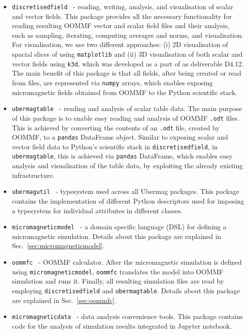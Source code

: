 \documentclass{deliverablereport}
\begin{document}
\begin{itemize}
\item \texttt{discretisedfield}~\cite{discretisedfield} - reading,
  writing, analysis, and visualisation of scalar and vector
  fields. This package provides all the necessary functionality for
  reading resulting OOMMF vector and scalar field files and their
  analysis, such as sampling, iterating, computing averages and norms,
  and visualisation. For visualisation, we use two different
  approaches: (i) 2D visualisation of spacial slices of using
  \texttt{matplotlib} and (ii) 3D visualisation of both scalar and
  vector fields using \texttt{k3d}, which was developed as a part of
  \ODK as deliverable D4.12. The main benefit of this package is
  that all fields, after being created or read from files, are
  represented via \texttt{numpy} arrays, which enables exposing
  micromagnetic fields obtained from OOMMF to the Python scientific
  stack.
\item \texttt{ubermagtable}~\cite{ubermagtable} - reading and analysis
  of scalar table data. The main purpose of this package is to enable
  easy reading and analysis of OOMMF \texttt{.odt} files. This is
  achieved by converting the contents of an \texttt{.odt} file,
  created by OOMMF, to a \texttt{pandas} DataFrame object. Similar to
  exposing scalar and vector field data to Python's scientific stack
  in \texttt{discretisedfield}, in \texttt{ubermagtable}, this is
  achieved via \texttt{pandas} DataFrame, which enables easy analysis
  and visualisation of the table data, by exploiting the already
  existing infrastructure.
\item \texttt{ubermagutil}~\cite{ubermagutil} - typesystem used across all Ubermag
packages. This package contains the implementation of different Python
descriptors used for imposing a typesystem for individual attributes
in different classes.
\item \texttt{micromagneticmodel}~\cite{micromagneticmodel} - a domain
  specific language (DSL) for defining a micromagnetic
  simulation. Details about this package are explained in
  Sec.~\ref{sec:micromagneticmodel}.
\item \texttt{oommfc}~\cite{oommfc} - OOMMF calculator. After the
  micromagnetic simulation is defined using
  \texttt{micromagneticmodel}, \texttt{oommfc} translates the model
  into OOMMF simulation and runs it. Finally, all resulting simulation
  files are read by employing \texttt{discretisedfield} and
  \texttt{ubermagtable}. Details about this package are explained in
  Sec.~\ref{sec:oommfc}.
\item \texttt{micromagneticdata}~\cite{micromagneticdata} - data
  analysis convenience tools. This package contains code for the
  analysis of simulation results integrated in Jupyter notebook.
\end{itemize}
\end{document}
